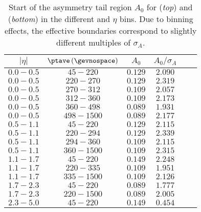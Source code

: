 \begin{table}[!htb]
  \caption{
    Start of the asymmetry tail region $A_{0}$ for  (\textit{top}) and  (\textit{bottom}) in the different \ptave and $\eta$ bins. 
    Due to binning effects, the effective boundaries correspond to slightly different multiples of $\sigma_{A}$.
  }
  \label{tab:App:ResTail:WindowBorders}
  \begin{center}
    \begin{tabular}{cccccc}
      \toprule
      $|\eta|$ & $\ptave \,(\gevnospace)$ & $A_{0}$ & $A_{0}/\sigma_{A}$ \\ 
      \midrule
      $0.0 - 0.5$ & $45 - 220$ & $0.129$ & $2.090$ \\
      $0.0 - 0.5$ & $220 - 270$ & $0.129$ & $2.319$ \\
      $0.0 - 0.5$ & $270 - 312$ & $0.109$ & $2.057$ \\
      $0.0 - 0.5$ & $312 - 360$ & $0.109$ & $2.173$ \\
      $0.0 - 0.5$ & $360 - 498$ & $0.089$ & $1.931$ \\
      $0.0 - 0.5$ & $498 - 1500$ & $0.089$ & $2.177$ \\
      \midrule
      $0.5 - 1.1$ & $45 - 220$ & $0.129$ & $2.115$ \\
      $0.5 - 1.1$ & $220 - 294$ & $0.129$ & $2.339$ \\
      $0.5 - 1.1$ & $294 - 360$ & $0.109$ & $2.115$ \\
      $0.5 - 1.1$ & $360 - 1500$ & $0.109$ & $2.315$ \\
      \midrule
      $1.1 - 1.7$ & $45 - 220$ & $0.149$ & $2.248$ \\
      $1.1 - 1.7$ & $220 - 335$ & $0.109$ & $1.951$ \\
      $1.1 - 1.7$ & $335 - 1500$ & $0.109$ & $2.126$ \\
      \midrule
      $1.7 - 2.3$ & $45 - 220$ & $0.089$ & $1.777$ \\
      $1.7 - 2.3$ & $220 - 1500$ & $0.089$ & $2.005$ \\
      \midrule
      $2.3 - 5.0$ & $45 - 220$ & $0.149$ & $0.454$ \\
      \bottomrule
    \end{tabular}
  \end{center}
  


\end{table}
